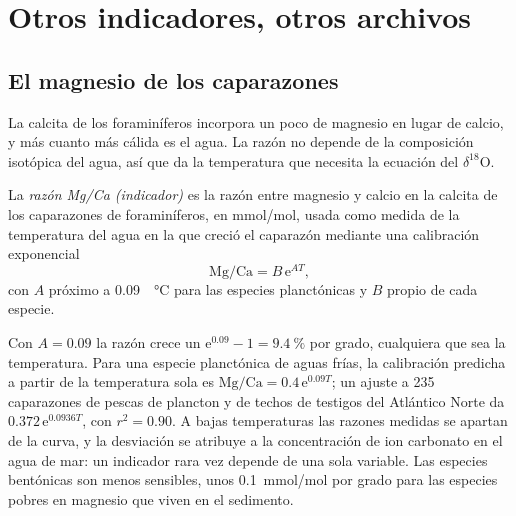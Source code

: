 \section{Otros indicadores, otros archivos}\label{sec:b2:climate-proxies:others}

\subsection*{El magnesio de los caparazones}

La calcita de los foraminíferos incorpora un poco de magnesio en lugar de calcio, y más cuanto
más cálida es el agua. La razón no depende de la composición isotópica del agua, así que
da la temperatura que necesita la ecuación del $\delta^{18}$O.

\begin{definition}\label{def:b2:climate-proxies:mgca}
La \emph{razón Mg/Ca (indicador)} es la razón entre magnesio y calcio en
la calcita de los caparazones de foraminíferos, en \unit{mmol/mol}, usada como medida de la temperatura del
agua en la que creció el caparazón mediante una calibración exponencial
\[
  \text{Mg/Ca} = B\,\mathrm{e}^{A T},
\]
con $A$ próximo a \qty{0.09}{\per\celsius} para las especies planctónicas y $B$ propio de cada especie.
\end{definition}

Con $A = 0.09$ la razón crece un $\mathrm{e}^{0.09} - 1 = \qty{9.4}{\percent}$ por grado,
cualquiera que sea la temperatura. Para una especie planctónica de aguas frías, la calibración predicha a partir de
la temperatura sola es $\text{Mg/Ca} = 0.4\,\mathrm{e}^{0.09T}$; un ajuste a 235 caparazones de pescas de
plancton y de techos de testigos del Atlántico Norte da $0.372\,\mathrm{e}^{0.0936T}$, con $r^2 = 0.90$.
A bajas temperaturas las razones medidas se apartan de la curva, y la desviación se atribuye a
la concentración de ion carbonato en el agua de mar: un indicador rara vez depende de una sola variable.
Las especies bentónicas son menos sensibles, unos \qty{0.1}{mmol/mol} por grado para las especies pobres en magnesio
que viven en el sedimento.

